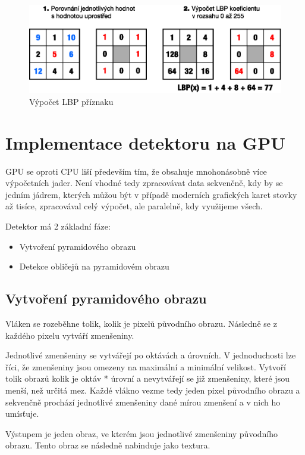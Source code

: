 \documentclass[12pt,a4paper,titlepage,final]{report}
\begin{document}
\begin{figure}[ht]
\begin{center}
\includegraphics[width=14cm]{images/lbp.eps}
\caption{Výpočet LBP příznaku}
\label{fig:theory}
\end{center}
\end{figure}

\section{Implementace detektoru na GPU}
GPU se oproti CPU liší především tím, že obsahuje mnohonásobně více výpočetních jader. Není vhodné tedy zpracovávat data sekvenčně, kdy by se jedním jádrem, kterých můžou být v případě moderních grafických karet stovky až tisíce, zpracovával celý výpočet, ale paralelně, kdy využijeme všech.

Detektor má 2 základní fáze:
\begin{itemize}
	\item Vytvoření pyramidového obrazu
	\item Detekce obličejů na pyramidovém obrazu
\end{itemize}

\subsection{Vytvoření pyramidového obrazu}
Vláken se rozeběhne tolik, kolik je pixelů původního obrazu. Následně se z každého pixelu vytváří zmenšeniny.

Jednotlivé zmenšeniny se vytvářejí po oktávách a úrovních. V jednoduchosti lze říci, že zmenšeniny jsou omezeny na maximální a minimální velikost. Vytvoří tolik obrazů kolik je oktáv * úrovní a nevytvářejí se již zmenšeniny, které jsou menší, než určitá mez.
Každé vlákno vezme tedy jeden pixel původního obrazu a sekvenčně prochází jednotlivé zmenšeniny dané mírou zmenšení a v nich ho umísťuje.

Výstupem je jeden obraz, ve kterém jsou jednotlivé zmenšeniny původního obrazu. Tento obraz se následně nabinduje jako textura.
\end{document}
